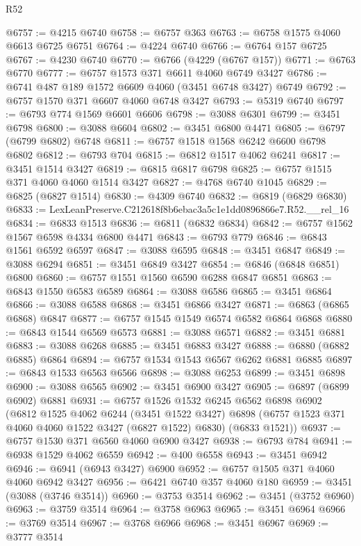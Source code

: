 \begin{lexlean}{R52}
\begin{coremodule}
@6757 := @4215 @6740
@6758 := @6757 @363
@6763 := @6758 @1575 @4060 @6613 @6725 @6751
@6764 := @4224 @6740
@6766 := @6764 @157 @6725
@6767 := @4230 @6740
@6770 := @6766 (@4229 (@6767 @157))
@6771 := @6763 @6770
@6777 := @6757 @1573 @371 @6611 @4060 @6749 @3427
@6786 := @6741 @487 @189 @1572 @6609 @4060 (@3451 @6748 @3427) @6749
@6792 := @6757 @1570 @371 @6607 @4060 @6748 @3427
@6793 := @5319 @6740
@6797 := @6793 @774 @1569 @6601 @6606
@6798 := @3088 @6301
@6799 := @3451 @6798
@6800 := @3088 @6604
@6802 := @3451 @6800 @4471
@6805 := @6797 (@6799 @6802) @6748
@6811 := @6757 @1518 @1568 @6242 @6600 @6798 @6802
@6812 := @6793 @704
@6815 := @6812 @1517 @4062 @6241
@6817 := @3451 @1514 @3427
@6819 := @6815 @6817 @6798
@6825 := @6757 @1515 @371 @4060 @4060 @1514 @3427
@6827 := @4768 @6740 @1045
@6829 := @6825 (@6827 @1514)
@6830 := @4309 @6740
@6832 := @6819 (@6829 @6830)
@6833 := LexLeanPreserve.C212618f8b6ebac3a5c1e1dd0896866e7.R52.__rel_16
@6834 := @6833 @1513
@6836 := @6811 (@6832 @6834)
@6842 := @6757 @1562 @1567 @6598 @4334 @6800 @4471
@6843 := @6793 @779
@6846 := @6843 @1561 @6592 @6597
@6847 := @3088 @6595
@6848 := @3451 @6847
@6849 := @3088 @6294
@6851 := @3451 @6849 @3427
@6854 := @6846 (@6848 @6851) @6800
@6860 := @6757 @1551 @1560 @6590 @6288 @6847 @6851
@6863 := @6843 @1550 @6583 @6589
@6864 := @3088 @6586
@6865 := @3451 @6864
@6866 := @3088 @6588
@6868 := @3451 @6866 @3427
@6871 := @6863 (@6865 @6868) @6847
@6877 := @6757 @1545 @1549 @6574 @6582 @6864 @6868
@6880 := @6843 @1544 @6569 @6573
@6881 := @3088 @6571
@6882 := @3451 @6881
@6883 := @3088 @6268
@6885 := @3451 @6883 @3427
@6888 := @6880 (@6882 @6885) @6864
@6894 := @6757 @1534 @1543 @6567 @6262 @6881 @6885
@6897 := @6843 @1533 @6563 @6566
@6898 := @3088 @6253
@6899 := @3451 @6898
@6900 := @3088 @6565
@6902 := @3451 @6900 @3427
@6905 := @6897 (@6899 @6902) @6881
@6931 := @6757
    @1526
    @1532
    @6245
    @6562
    @6898
    @6902
    (@6812
      @1525
      @4062
      @6244
      (@3451 @1522 @3427)
      @6898
      (@6757 @1523 @371 @4060 @4060 @1522 @3427 (@6827 @1522) @6830)
      (@6833 @1521))
@6937 := @6757 @1530 @371 @6560 @4060 @6900 @3427
@6938 := @6793 @784
@6941 := @6938 @1529 @4062 @6559
@6942 := @400 @6558
@6943 := @3451 @6942
@6946 := @6941 (@6943 @3427) @6900
@6952 := @6757 @1505 @371 @4060 @4060 @6942 @3427
@6956 := @6421 @6740 @357 @4060 @180
@6959 := @3451 (@3088 (@3746 @3514))
@6960 := @3753 @3514
@6962 := @3451 (@3752 @6960)
@6963 := @3759 @3514
@6964 := @3758 @6963
@6965 := @3451 @6964
@6966 := @3769 @3514
@6967 := @3768 @6966
@6968 := @3451 @6967
@6969 := @3777 @3514

\end{coremodule}
\end{lexlean}
